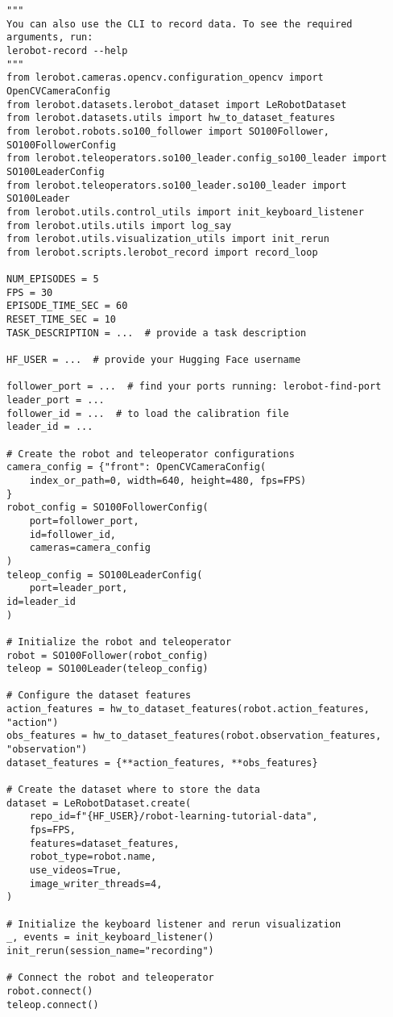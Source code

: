\begin{verbatim}
"""
You can also use the CLI to record data. To see the required arguments, run:
lerobot-record --help
"""
from lerobot.cameras.opencv.configuration_opencv import OpenCVCameraConfig
from lerobot.datasets.lerobot_dataset import LeRobotDataset
from lerobot.datasets.utils import hw_to_dataset_features
from lerobot.robots.so100_follower import SO100Follower, SO100FollowerConfig
from lerobot.teleoperators.so100_leader.config_so100_leader import SO100LeaderConfig
from lerobot.teleoperators.so100_leader.so100_leader import SO100Leader
from lerobot.utils.control_utils import init_keyboard_listener
from lerobot.utils.utils import log_say
from lerobot.utils.visualization_utils import init_rerun
from lerobot.scripts.lerobot_record import record_loop

NUM_EPISODES = 5
FPS = 30
EPISODE_TIME_SEC = 60
RESET_TIME_SEC = 10
TASK_DESCRIPTION = ...  # provide a task description

HF_USER = ...  # provide your Hugging Face username

follower_port = ...  # find your ports running: lerobot-find-port
leader_port = ...
follower_id = ...  # to load the calibration file
leader_id = ...

# Create the robot and teleoperator configurations
camera_config = {"front": OpenCVCameraConfig(
    index_or_path=0, width=640, height=480, fps=FPS)
}
robot_config = SO100FollowerConfig(
    port=follower_port,
    id=follower_id,
    cameras=camera_config
)
teleop_config = SO100LeaderConfig(
    port=leader_port, 
id=leader_id
)

# Initialize the robot and teleoperator
robot = SO100Follower(robot_config)
teleop = SO100Leader(teleop_config)

# Configure the dataset features
action_features = hw_to_dataset_features(robot.action_features, "action")
obs_features = hw_to_dataset_features(robot.observation_features, "observation")
dataset_features = {**action_features, **obs_features}

# Create the dataset where to store the data
dataset = LeRobotDataset.create(
    repo_id=f"{HF_USER}/robot-learning-tutorial-data",
    fps=FPS,
    features=dataset_features,
    robot_type=robot.name,
    use_videos=True,
    image_writer_threads=4,
)

# Initialize the keyboard listener and rerun visualization
_, events = init_keyboard_listener()
init_rerun(session_name="recording")

# Connect the robot and teleoperator
robot.connect()
teleop.connect()


\end{verbatim}
